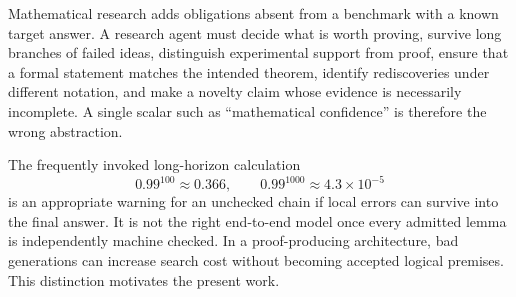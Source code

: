 Mathematical research adds obligations absent from a benchmark with a known target answer. A research agent must decide what is worth proving, survive long branches of failed ideas, distinguish experimental support from proof, ensure that a formal statement matches the intended theorem, identify rediscoveries under different notation, and make a novelty claim whose evidence is necessarily incomplete. A single scalar such as ``mathematical confidence'' is therefore the wrong abstraction.

The frequently invoked long-horizon calculation
\[
0.99^{100}\approx 0.366,
\qquad
0.99^{1000}\approx 4.3\times 10^{-5}
\]
is an appropriate warning for an unchecked chain if local errors can survive into the final answer. It is not the right end-to-end model once every admitted lemma is independently machine checked. In a proof-producing architecture, bad generations can increase search cost without becoming accepted logical premises. This distinction motivates the present work.
